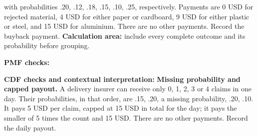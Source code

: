 with probabilities .20, .12, .18, .15, .10, .25, respectively. Payments are 0 USD for rejected material, 4 USD
for either paper or cardboard, 9 USD for either plastic or steel, and 15 USD for aluminium. There are no other
payments. Record the buyback payment.
\textbf{Calculation area:} include every complete outcome and its probability before grouping.
\par%
\noindent%
\begin{minipage}[t]{.37\linewidth}%
  \vspace{0pt}\centering
\end{minipage}%
\hfill%
\begin{minipage}[t]{.60\linewidth}%
  \vspace{0pt}\centering
\end{minipage}%
\par
\textbf{PMF checks:} \hrulefill%
\par
{}
\par%
\noindent%
\begin{minipage}[t]{.37\linewidth}%
  \vspace{0pt}\centering
\end{minipage}%
\hfill%
\begin{minipage}[t]{.60\linewidth}%
  \vspace{0pt}\centering
\end{minipage}%
\par
\textbf{CDF checks and contextual interpretation:}
\vfill
\clearpage
{}
\textbf{Missing probability and capped payout.} A delivery insurer can receive only 0, 1, 2, 3 or 4 claims in
one day. Their probabilities, in that order, are .15, .20, a missing probability, .20, .10. It pays 5 USD per
claim, capped at 15 USD in total for the day; it pays the smaller of 5 times the count and 15 USD. There are
no other payments. Record the daily payout.

